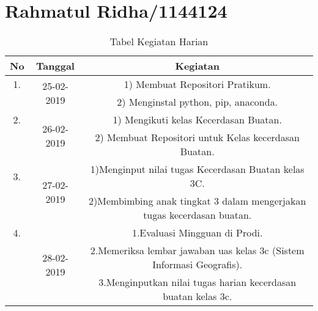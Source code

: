 \chapter{Rahmatul Ridha/1144124}

\begin{table}[h]
\caption{Tabel Kegiatan Harian}
\centering
\begin{tabular}{|c|c|c|}
\hline
No&Tanggal&Kegiatan\\
\hline
1.&\multirow{2}{*}{25-02-2019}&1) Membuat Repositori Pratikum.\\
&&2) Menginstal python, pip, anaconda.\\
\hline
2.&\multirow{2}{*}{26-02-2019}&1) Mengikuti kelas Kecerdasan Buatan.\\
&&2) Membuat Repositori untuk Kelas kecerdasan Buatan.\\
\hline
3.&\multirow{2}{*}{27-02-2019}&1)Menginput nilai tugas Kecerdasan Buatan kelas 3C.\\
&&2)Membimbing anak tingkat 3 dalam mengerjakan tugas kecerdasan buatan.\\
\hline
4.&\multirow{3}{*}{28-02-2019}&1.Evaluasi Mingguan di Prodi.\\
&&2.Memeriksa lembar jawaban uas kelas 3c (Sistem Informasi Geografis).\\
&&3.Menginputkan nilai tugas harian kecerdasan buatan kelas 3c.\\
\hline
\end{tabular}
\label{table:contoh}
\end{table}


